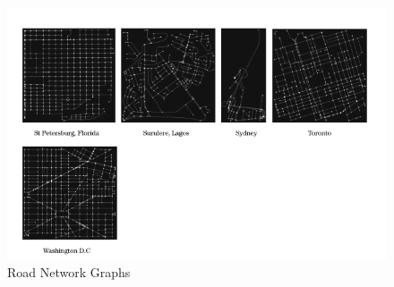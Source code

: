 \begin{figure}[h!]
\centering
\includegraphics[width=1.0\textwidth,center]{picture/Graphs2.png}
\caption[Miniaturtrichter]{Road Network Graphs}
\label{fig:roadnetworkgraphs}
\end{figure}

